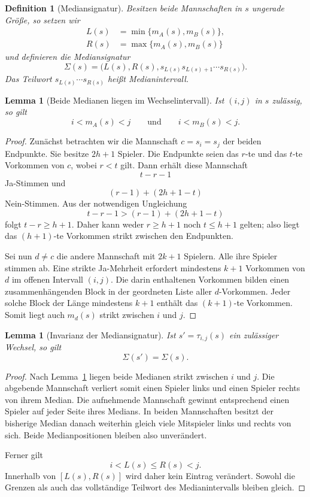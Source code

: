 \documentclass[12pt]{article}
\newtheorem{definition}[satz]{Definition}
\newtheorem{lemma}[satz]{Lemma}
\begin{document}
\begin{definition}[Mediansignatur]
Besitzen beide Mannschaften in $s$ ungerade Größe, so setzen wir
\begin{align*}
L(s)&=\min\{m_A(s),m_B(s)\},\\
R(s)&=\max\{m_A(s),m_B(s)\}
\end{align*}
und definieren die \emph{Mediansignatur}
\[
\Sigma(s)=
\bigl(L(s),R(s),s_{L(s)}s_{L(s)+1}\cdots s_{R(s)}\bigr).
\]
Das Teilwort $s_{L(s)}\cdots s_{R(s)}$ heißt \emph{Medianintervall}.
\end{definition}

\begin{lemma}[Beide Medianen liegen im Wechselintervall]
\label{lem:medianen-im-intervall}
Ist $(i,j)$ in $s$ zulässig, so gilt
\[
i<m_A(s)<j
\qquad\text{und}\qquad
i<m_B(s)<j.
\]
\end{lemma}

\begin{proof}
Zunächst betrachten wir die Mannschaft $c=s_i=s_j$ der beiden Endpunkte.
Sie besitze $2h+1$ Spieler. Die Endpunkte seien das $r$-te und das $t$-te
Vorkommen von $c$, wobei $r<t$ gilt. Dann erhält diese Mannschaft
\[
t-r-1
\]
Ja-Stimmen und
\[
(r-1)+(2h+1-t)
\]
Nein-Stimmen. Aus der notwendigen Ungleichung
\[
t-r-1>(r-1)+(2h+1-t)
\]
folgt $t-r\ge h+1$. Daher kann weder $r\ge h+1$ noch $t\le h+1$ gelten;
also liegt das $(h+1)$-te Vorkommen strikt zwischen den Endpunkten.

Sei nun $d\ne c$ die andere Mannschaft mit $2k+1$ Spielern. Alle ihre
Spieler stimmen ab. Eine strikte Ja-Mehrheit erfordert mindestens $k+1$
Vorkommen von $d$ im offenen Intervall $(i,j)$. Die darin enthaltenen
Vorkommen bilden einen zusammenhängenden Block in der geordneten Liste aller
$d$-Vorkommen. Jeder solche Block der Länge mindestens $k+1$ enthält das
$(k+1)$-te Vorkommen. Somit liegt auch $m_d(s)$ strikt zwischen $i$ und $j$.
\end{proof}

\begin{lemma}[Invarianz der Mediansignatur]
\label{lem:signatur-invariant}
Ist $s'=\tau_{i,j}(s)$ ein zulässiger Wechsel, so gilt
\[
\Sigma(s')=\Sigma(s).
\]
\end{lemma}

\begin{proof}
Nach Lemma~\ref{lem:medianen-im-intervall} liegen beide Medianen strikt
zwischen $i$ und $j$. Die abgebende Mannschaft verliert somit einen Spieler
links und einen Spieler rechts von ihrem Median. Die aufnehmende Mannschaft
gewinnt entsprechend einen Spieler auf jeder Seite ihres Medians. In beiden
Mannschaften besitzt der bisherige Median danach weiterhin gleich viele
Mitspieler links und rechts von sich. Beide Medianpositionen bleiben also
unverändert.

Ferner gilt
\[
i<L(s)\le R(s)<j.
\]
Innerhalb von $[L(s),R(s)]$ wird daher kein Eintrag verändert. Sowohl die
Grenzen als auch das vollständige Teilwort des Medianintervalls bleiben
gleich.
\end{proof}
\end{document}

